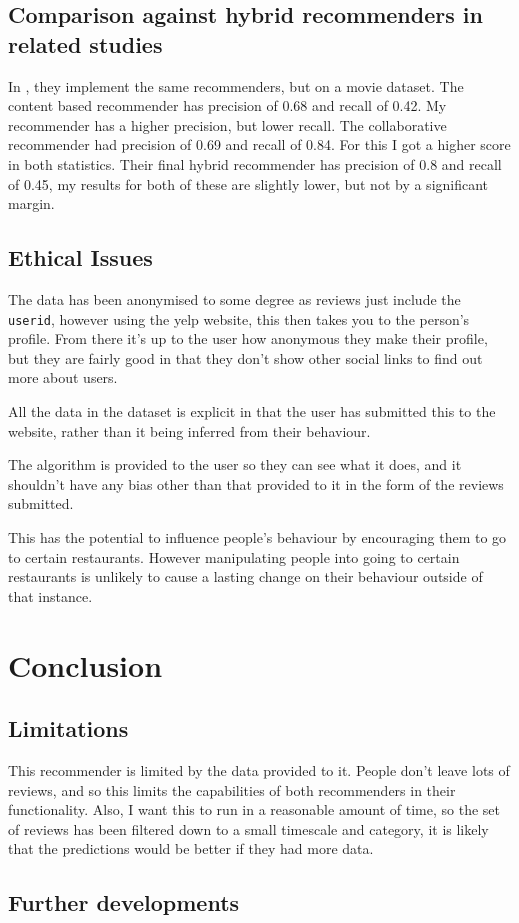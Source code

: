 \documentclass[conference]{IEEEtran}
\begin{document}
\subsection{Comparison against hybrid recommenders in related studies}

In \cite{evaluation}, they implement the same recommenders, but on a movie dataset. The content based recommender has precision of 0.68 and recall of 0.42. My recommender has a higher precision, but lower recall. The collaborative recommender had precision of 0.69 and recall of 0.84. For this I got a higher score in both statistics. Their final hybrid recommender has precision of 0.8 and recall of 0.45, my results for both of these are slightly lower, but not by a significant margin.

\subsection{Ethical Issues}

The data has been anonymised to some degree as reviews just include the \texttt{userid}, however using the yelp website, this then takes you to the person's profile. From there it's up to the user how anonymous they make their profile, but they are fairly good in that they don't show other social links to find out more about users.

All the data in the dataset is explicit in that the user has submitted this to the website, rather than it being inferred from their behaviour.

The algorithm is provided to the user so they can see what it does, and it shouldn't have any bias other than that provided to it in the form of the reviews submitted.

This has the potential to influence people's behaviour by encouraging them to go to certain restaurants. However manipulating people into going to certain restaurants is unlikely to cause a lasting change on their behaviour outside of that instance.



\section{Conclusion}

\subsection{Limitations}

This recommender is limited by the data provided to it. People don't leave lots of reviews, and so this limits the capabilities of both recommenders in their functionality. Also, I want this to run in a reasonable amount of time, so the set of reviews has been filtered down to a small timescale and category, it is likely that the predictions would be better if they had more data.

\subsection{Further developments}




\end{document}
